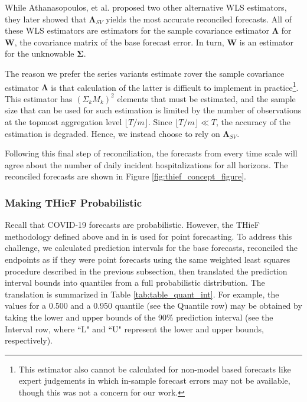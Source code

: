 \documentclass[12pt]{article}
\begin{document}
While Athanasopoulos, et al. proposed two other alternative WLS estimators, they later showed that $\boldsymbol{\Lambda}_{SV}$ yields the most accurate reconciled forecasts. All of these WLS estimators are estimators for the sample covariance estimator $\boldsymbol{\Lambda}$ for $\boldsymbol{W}$, the covariance matrix of the base forecast error. In turn, $\boldsymbol{W}$ is an estimator for the unknowable $\boldsymbol{\Sigma}$\cite{thief}.

The reason we prefer the series variants estimate rover the sample covariance estimator $\boldsymbol{\Lambda}$ is that calculation of the latter is difficult to implement in practice\footnote{This estimator also cannot be calculated for non-model based forecasts like expert judgements in which in-sample forecast errors may not be available\cite{thief}, though this was not a concern for our work.}. This estimator has $(\Sigma_k M_k)^2$ elements that must be estimated, and the sample size that can be used for such estimation is limited by the number of observations at the topmost aggregation level $\lfloor T/m \rfloor$. Since $\lfloor T/m \rfloor \ll T$, the accuracy of the estimation is degraded. Hence, we instead choose to rely on $\boldsymbol{\Lambda}_{SV}$\cite{thief}.

Following this final step of reconciliation, the forecasts from every time scale will agree about the number of daily incident hospitalizations for all horizons. The reconciled forecasts are shown in Figure \ref{fig:thief_concept_figure}.

\subsubsection{Making THieF Probabilistic} \label{probabilistic_thief}
Recall that COVID-19 forecasts are probabilistic. However, the THieF methodology defined above and in \cite{thief} is used for point forecasting. To address this challenge, we calculated prediction intervals for the base forecasts, reconciled the endpoints as if they were point forecasts using the same weighted least squares procedure described in the previous subsection, then translated the prediction interval bounds into quantiles from a full probabilistic distribution. The translation is summarized in Table \ref{tab:table_quant_int}. For example, the values for a 0.500 and a 0.950 quantile (see the Quantile row) may be obtained by taking the lower and upper bounds of the 90\% prediction interval (see the Interval row, where ``L" and ``U" represent the lower and upper bounds, respectively).
\end{document}
